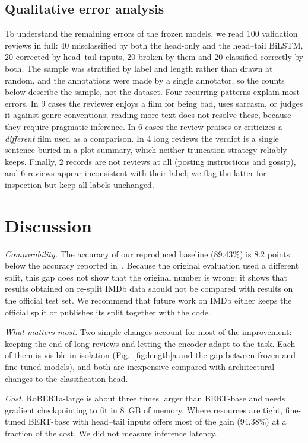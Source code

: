 \documentclass[conference]{IEEEtran}
\begin{document}
\subsection{Qualitative error analysis}
To understand the remaining errors of the frozen models, we read 100 validation reviews in full: 40 misclassified by both the head-only and the head--tail BiLSTM, 20 corrected by head--tail inputs, 20 broken by them and 20 classified correctly by both. The sample was stratified by label and length rather than drawn at random, and the annotations were made by a single annotator, so the counts below describe the sample, not the dataset. Four recurring patterns explain most errors. In 9 cases the reviewer enjoys a film for being bad, uses sarcasm, or judges it against genre conventions; reading more text does not resolve these, because they require pragmatic inference. In 6 cases the review praises or criticizes a \emph{different} film used as a comparison. In 4 long reviews the verdict is a single sentence buried in a plot summary, which neither truncation strategy reliably keeps. Finally, 2 records are not reviews at all (posting instructions and gossip), and 6 reviews appear inconsistent with their label; we flag the latter for inspection but keep all labels unchanged.

\section{Discussion}
\textit{Comparability.} The accuracy of our reproduced baseline (89.43\%) is 8.2 points below the accuracy reported in~\cite{nkhata2023}. Because the original evaluation used a different split, this gap does not show that the original number is wrong; it shows that results obtained on re-split IMDb data should not be compared with results on the official test set. We recommend that future work on IMDb either keeps the official split or publishes its split together with the code.

\textit{What matters most.} Two simple changes account for most of the improvement: keeping the end of long reviews and letting the encoder adapt to the task. Each of them is visible in isolation (Fig.~\ref{fig:length}a and the gap between frozen and fine-tuned models), and both are inexpensive compared with architectural changes to the classification head.

\textit{Cost.} RoBERTa-large is about three times larger than BERT-base and needs gradient checkpointing to fit in 8~GB of memory. Where resources are tight, fine-tuned BERT-base with head--tail inputs offers most of the gain (94.38\%) at a fraction of the cost. We did not measure inference latency.
\end{document}
